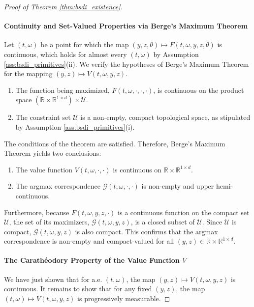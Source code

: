 \documentclass[12pt, letterpaper]{amsart}
\newcommand{\Ucal}{\mathcal{U}}
\newcommand{\R}{\mathbb{R}}
\theoremstyle{plain}
\theoremstyle{definition}
\theoremstyle{remark}
\numberwithin{equation}{section} %
\begin{document}
\begin{proof}[Proof of Theorem \ref{thm:bsdi_existence}]
\paragraph{\textbf{Continuity and Set-Valued Properties via Berge's Maximum Theorem}}
Let $(t,\omega)$ be a point for which the map $(y,z,\theta) \mapsto F(t,\omega,y,z,\theta)$ is continuous, which holds for almost every $(t,\omega)$ by Assumption \ref{ass:bsdi_primitives}(ii). We verify the hypotheses of Berge's Maximum Theorem \cite[Theorem 17.31]{Aliprantis2006} for the mapping $(y,z) \mapsto V(t,\omega,y,z)$.
\begin{enumerate}[label=(\alph*)]
    \item The function being maximized, $F(t,\omega, \cdot, \cdot, \cdot)$, is continuous on the product space $(\R \times \R^{1\times d}) \times \Ucal$.
    \item The constraint set $\Ucal$ is a non-empty, compact topological space, as stipulated by Assumption \ref{ass:bsdi_primitives}(i).
\end{enumerate}
The conditions of the theorem are satisfied. Therefore, Berge's Maximum Theorem yields two conclusions:
\begin{enumerate}[label=(\roman*)]
    \item The value function $V(t,\omega, \cdot, \cdot)$ is continuous on $\R \times \R^{1\times d}$.
    \item The argmax correspondence $\mathcal{G}(t,\omega, \cdot, \cdot)$ is non-empty and upper hemi-continuous.
\end{enumerate}
Furthermore, because $F(t,\omega,y,z,\cdot)$ is a continuous function on the compact set $\Ucal$, the set of its maximizers, $\mathcal{G}(t,\omega,y,z)$, is a closed subset of $\Ucal$. Since $\Ucal$ is compact, $\mathcal{G}(t,\omega,y,z)$ is also compact. This confirms that the argmax correspondence is non-empty and compact-valued for all $(y,z) \in \R \times \R^{1\times d}$.

\paragraph{\textbf{The Carathéodory Property of the Value Function $V$}}
We have just shown that for a.e. $(t,\omega)$, the map $(y,z) \mapsto V(t,\omega,y,z)$ is continuous. It remains to show that for any fixed $(y,z)$, the map $(t,\omega) \mapsto V(t,\omega,y,z)$ is progressively measurable.


\end{proof}
\end{document}
